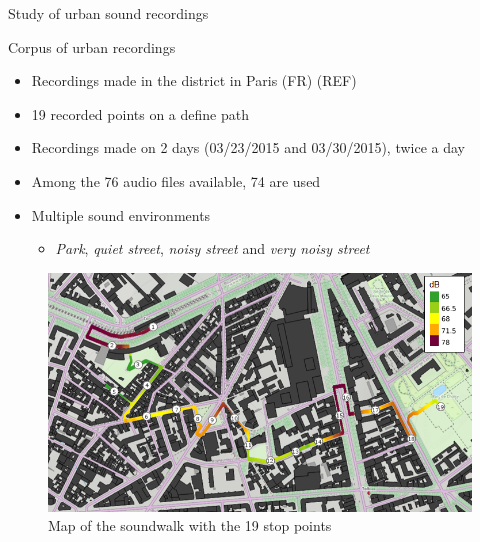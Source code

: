 \documentclass{beamer}
\begin{document}
\begin{frame}{Study of urban sound recordings}

\begin{block}{Corpus of urban recordings}
\begin{itemize}
	 \item Recordings made in the  district in Paris (FR) (REF)
	 \item 19 recorded points on a define path
	 \item Recordings made on 2 days (03/23/2015 and 03/30/2015), twice a day
	 \item Among the 76 audio files available, 74 are used
	 \item Multiple sound environments 
	 \begin{itemize}
	 	\item \textit{Park}, \textit{quiet street}, \textit{noisy street} and \textit{very noisy street}
	 \end{itemize}
\end{itemize}
\end{block}

\begin{figure}[hbtp]
\centering
\includegraphics[width=.4\linewidth]{pictures/trajet_19pts.png}
\caption{Map of the soundwalk with the 19 stop points}
\end{figure}


\end{frame}

\end{document}
